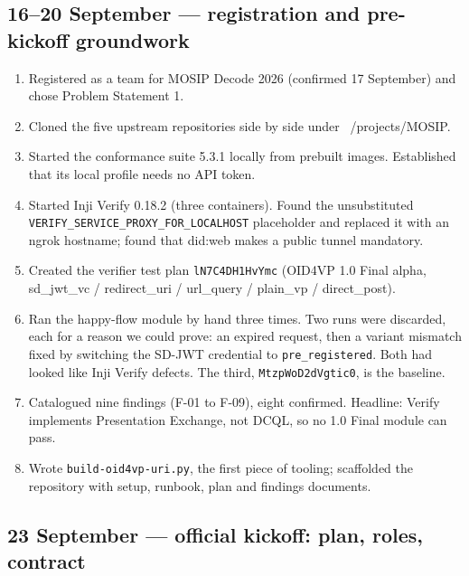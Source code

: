 \documentclass[10pt,a4paper]{article}
\newcommand{\tightlist}{\setlength{\itemsep}{1pt}\setlength{\parskip}{0pt}\setlength{\parsep}{0pt}}
\newcommand{\us}{\_}
\begin{document}
\subsection{16--20 September --- registration and pre-kickoff groundwork}

\begin{enumerate}\tightlist
  \item Registered as a team for MOSIP Decode 2026 (confirmed 17 September) and chose
        Problem Statement 1.
  \item Cloned the five upstream repositories side by side under ~/projects/MOSIP.
  \item Started the conformance suite 5.3.1 locally from prebuilt images. Established
        that its local profile needs no API token.
  \item Started Inji Verify 0.18.2 (three containers). Found the unsubstituted
        \texttt{VERIFY\us{}SERVICE\us{}PROXY\us{}FOR\us{}LOCALHOST} placeholder and replaced
        it with an ngrok hostname; found that did:web makes a public tunnel mandatory.
  \item Created the verifier test plan \texttt{lN7C4DH1HvYmc} (OID4VP 1.0 Final alpha,
        sd\us{}jwt\us{}vc / redirect\us{}uri / url\us{}query / plain\us{}vp / direct\us{}post).
  \item Ran the happy-flow module by hand three times. Two runs were discarded, each for
        a reason we could prove: an expired request, then a variant mismatch fixed by
        switching the SD-JWT credential to \texttt{pre\us{}registered}. Both had looked like
        Inji Verify defects. The third, \texttt{MtzpWoD2dVgtic0}, is the baseline.
  \item Catalogued nine findings (F-01 to F-09), eight confirmed. Headline: Verify
        implements Presentation Exchange, not DCQL, so no 1.0 Final module can pass.
  \item Wrote \texttt{build-oid4vp-uri.py}, the first piece of tooling; scaffolded the
        repository with setup, runbook, plan and findings documents.
\end{enumerate}

\subsection{23 September --- official kickoff: plan, roles, contract}
\end{document}
